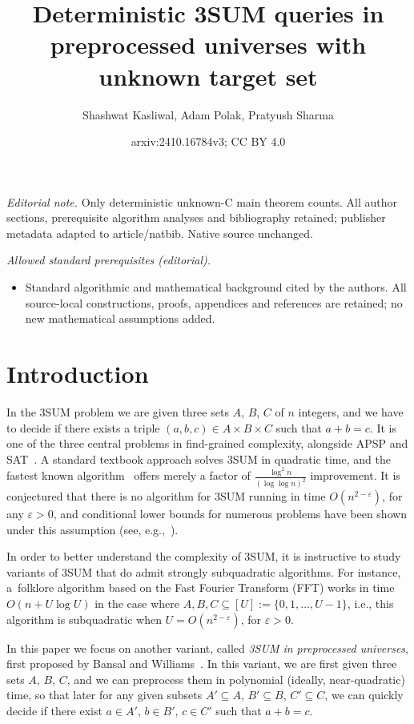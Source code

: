 \documentclass[10pt,a4paper]{article}
\title{Deterministic 3SUM queries in preprocessed universes with unknown target set}
\author{Shashwat Kasliwal, Adam Polak, Pratyush Sharma}
\date{arxiv:2410.16784v3; CC BY 4.0}
\begin{document}
\maketitle
\noindent\textit{Editorial note.} Only deterministic unknown-C main theorem counts. All author sections, prerequisite algorithm analyses and bibliography retained; publisher metadata adapted to article/natbib. Native source unchanged.\par\medskip
\noindent\textit{Allowed standard prerequisites (editorial).}\begin{itemize}
\item Standard algorithmic and mathematical background cited by the authors. All source-local constructions, proofs, appendices and references are retained; no new mathematical assumptions added.
\end{itemize}\medskip
\section{Introduction}

In the 3SUM problem we are given three sets $A$, $B$, $C$ of $n$ integers, and we have to decide if there exists a triple $(a, b, c) \in A \times B \times C$ such that $a+b = c$. It is one of the three central problems in find-grained complexity, alongside APSP and SAT~\cite{VassilevskaWilliams18}. A standard textbook approach solves 3SUM in quadratic time, and the fastest known algorithm~\cite{BaranDP08} offers merely a factor of $\frac{\log^2 n}{(\log \log n)^2}$ improvement. It is conjectured that there is no algorithm for 3SUM running in time $O(n^{2-\varepsilon})$, for any $\varepsilon > 0$, and conditional lower bounds for numerous problems have been shown under this assumption (see, e.g.,~\cite{VassilevskaWilliams18,FischerK024}).

In order to better understand the complexity of 3SUM, it is instructive to study variants of 3SUM that do admit strongly subquadratic algorithms. For instance, a~folklore algorithm based on the Fast Fourier Transform (FFT) works in time $O(n + U \log U)$ in the case where $A, B, C \subseteq [U] := \{0, 1, \ldots, U-1\}$, i.e., this algorithm is subquadratic when $U = O(n^{2-\varepsilon})$, for $\varepsilon > 0$.

In this paper we focus on another variant, called \emph{3SUM in preprocessed universes}, first proposed by Bansal and Williams~\cite{BansalW12}. In this variant, we are first given three sets $A$, $B$, $C$, and we can preprocess them in polynomial (ideally, near-quadratic) time, so that later for any given subsets $A' \subseteq A$, $B' \subseteq B$, $C' \subseteq C$, we can quickly decide if there exist $a \in A'$, $b \in B'$, $c \in C'$ such that $a+b=c$.
\end{document}
